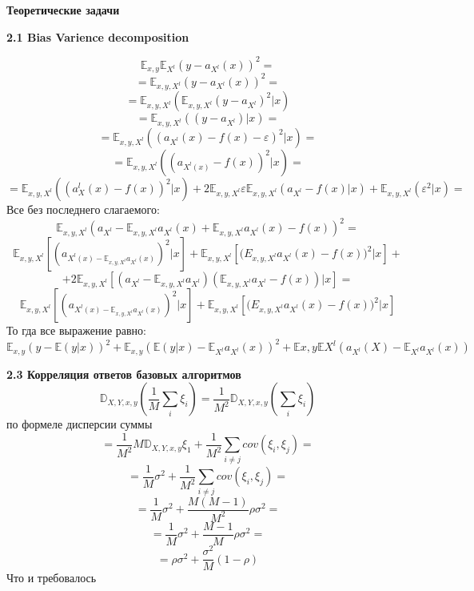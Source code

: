 \documentclass[11pt,a4paper]{article}
\newcommand{\eps}{\varepsilon}
\begin{document}
\begin{center}
\Huge {
\noindent
\textbf{Теоретические задачи}
}
\end{center}

\Large {
\textbf {2.1 Bias Varience decomposition}
}

$$\mathbb E_{x, y} \mathbb E_{X^l} (y - a_{X^l}(x))^2 = $$
$$ = \mathbb E_{x, y, X^l}(y - a_{X^l}(x))^2 =$$
$$ = \mathbb E_{x, y, X^l} (\mathbb E_{x, y, X^l} (y - a_{X^l})^2 | x) $$
$$ =\mathbb E_{x, y, X^l} ((y - a_{X^l})|x) = $$
$$ = \mathbb E_{x, y, X^l}((a_{X^l}(x) - f(x) - \eps)^2|x) =$$
$$ = \mathbb E_{x, y, X^l} ((a_{X^l(x)} - f(x))^2|x) = $$
$$ = \mathbb E_{x, y, X^l} ((a_X^l(x) - f(x))^2 |x) + 2 \mathbb E_{x, y, X^l}\eps \mathbb E_{x, y, X^l}(a_{X^l} - f(x)|x) + \mathbb E_{x, y, X^l}(\eps^2|x) = $$
Все без последнего слагаемого:
\\
$$ \mathbb E_{x, y, X^l} (a_{X^l} - \mathbb E_{x, y, X^l}a_{X^l}(x) + \mathbb E_{x, y, X^l} a_{X^l}(x) - f(x))^2 = $$
$$ \mathbb E_{x, y, X^l} [(a_{X^l(x) - \mathbb E_{x, y, X^l}a_{X^l}(x)})^2|x] + \mathbb E_{x, y, X^l}[\mathbb (E_{x, y, X^l} a_{X^l}(x) - f(x))^2|x]+$$
$$+ 2\mathbb E_{x, y, X^l} [(a_{X^l} - \mathbb E_{x, y, X^l}a_{X^l}) (\mathbb E_{x, y, X^l} a_{X^l} - f(x))|x]=$$
$$ \mathbb E_{x, y, X^l} [(a_{X^l(x) - \mathbb E_{x, y, X^l}a_{X^l}(x)})^2|x] + \mathbb E_{x, y, X^l}[\mathbb (E_{x, y, X^l} a_{X^l}(x) - f(x))^2|x]$$
То гда все выражение равно:
\\
$$\mathbb E_{x, y} (y - \mathbb E(y|x))^2 + \mathbb E_{x, y} (\mathbb E(y|x) - \mathbb E_{X^l}a_{X^l}(x))^2 + \mathbb E{x, y}\mathbb E{X^l}(a_{X^l}(X) - \mathbb E_{X^l}a_{X^l}(x))$$

\Large {
\textbf {2.3 Корреляция ответов базовых алгоритмов}
}
$$ \mathbb D_{X, Y, x, y} (\frac{1}{M} \sum_i \xi_i)= \frac{1}{M^2} \mathbb D_{X, Y, x, y} (\sum_i \xi_i)$$ по формеле дисперсии суммы
$$ = \frac{1}{M^2} M \mathbb D_{X, Y, x, y} \xi_1 + \frac{1}{M^2} \sum_{i \ne j} cov(\xi_i, \xi_j)=$$
$$ = \frac{1}{M} \sigma^2 + \frac{1}{M^2} \sum_{i \ne j} cov(\xi_i, \xi_j) =$$
$$ = \frac{1}{M} \sigma^2 + \frac{M(M - 1)}{M^2} \rho \sigma^2 = $$
$$ = \frac{1}{M} \sigma^2 + \frac{M - 1}{M} \rho \sigma^2 = $$
$$ = \rho \sigma^2 + \frac{\sigma^2}{M}(1 - \rho) $$
Что и требовалось
\end{document}
